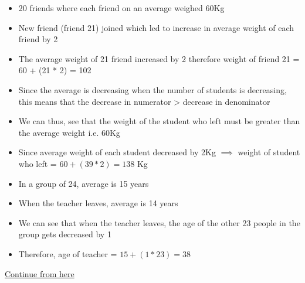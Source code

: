 \begin{itemize}
    \item 20 friends where each friend on an average weighed 60Kg
    \item New friend (friend 21) joined which led to increase in average weight of each friend by 2
    \item The average weight of 21 friend increased by 2 therefore weight of friend 21 = 60 + (21 * 2) = 102
\end{itemize}


\begin{itemize}
    \item Since the average is decreasing when the number of students is decreasing, this means that the decrease in numerator > decrease in denominator
    \item We can thus, see that the weight of the student who left must be greater than the average weight i.e. 60Kg
    \item Since average weight of each student decreased by 2Kg $\implies$ weight of student who left = $60 + (39 * 2) = 138$ Kg
\end{itemize}



\begin{itemize}
    \item In a group of 24, average is 15 years
    \item When the teacher leaves, average is 14 years
    \item We can see that when the teacher leaves, the age of the other 23 people in the group gets decreased by 1
    \item Therefore, age of teacher = $15 + (1 * 23) = 38$
\end{itemize}

\href{https://youtu.be/q-ZUkah-xys?feature=shared&t=1381}{Continue from here}